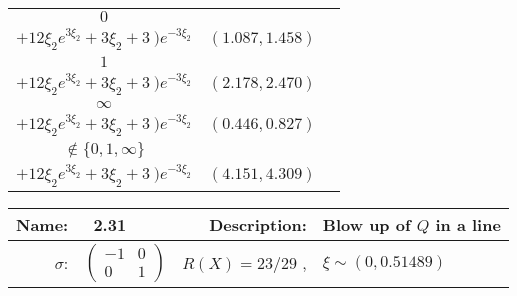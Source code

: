 {\begin{tabularx}{\textwidth}{|c|c|c}
\midrule
\(0\) & \begin{tabular}{l} \(\frac{1}{3\xi_2^{4}} \cdot
 ( \ (2   \xi_2^{3} - 3   \xi_2 - 3) e^{4   \xi_2} \)   \\ \hspace{2cm} \(+12 \xi_2 e^{3 \xi_2} + 3 \xi_2 + 3 \ ) e^{-3 \xi_2}\) \end{tabular} & \((1.087,1.458)\) \\ \midrule
\(1\) & \begin{tabular}{l} \(\frac{1}{3\xi_2^{4}} \cdot
 ( \ (2   \xi_2^{3} - 3   \xi_2 - 3) e^{4   \xi_2} \)   \\ \hspace{2cm} \(+12 \xi_2 e^{3 \xi_2} + 3 \xi_2 + 3 \ ) e^{-3 \xi_2}\) \end{tabular} & \((2.178,2.470)\) \\ \midrule
\(\infty\) & \begin{tabular}{l} \(\frac{1}{3\xi_2^{4}} \cdot
 ( \ (2   \xi_2^{3} - 3   \xi_2 - 3) e^{4   \xi_2} \)   \\ \hspace{2cm} \(+12 \xi_2 e^{3 \xi_2} + 3 \xi_2 + 3 \ ) e^{-3 \xi_2}\) \end{tabular} & \((0.446,0.827)\) \\ \midrule
\(\notin \{0,1,\infty\}\) & \begin{tabular}{l} \(\frac{1}{3\xi_2^{4}} \cdot
 ( \ (2   \xi_2^{3} - 3   \xi_2 - 3) e^{4   \xi_2} \)   \\ \hspace{2cm} \(+12 \xi_2 e^{3 \xi_2} + 3 \xi_2 + 3 \ ) e^{-3 \xi_2}\) \end{tabular} & \((4.151,4.309)\) \\
 \bottomrule
\end{tabularx}
\newpage
%
%
%
%
%
%
%
%
\begin{tabularx}{\textwidth}{rlrl}
\toprule
\textbf{Name:} & \ 2.31 \hspace{0.3\textwidth} & \textbf{Description:} & Blow up of $Q$ in a line\\
\midrule
\textbf{$\sigma$}: & {\small $\begin{pmatrix} -1 & 0 \\ 0 & 1 \end{pmatrix}$ } & $ R(X) = 23/29$ , & $\xi \sim (0,0.51489)$
\end{tabularx}

}

